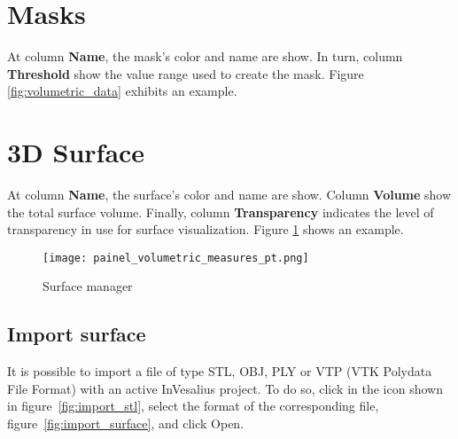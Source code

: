 \newpage


\section{Masks}


At column \textbf{Name}, the mask's color and name are show. In turn, column \textbf{Threshold} show the value range
used to create the mask. Figure \ref{fig:volumetric_data} exhibits an example.

\section{3D Surface}


At column \textbf{Name}, the surface's color and name are show. Column \textbf{Volume} show the total surface volume.
Finally, column \textbf{Transparency} indicates the level of transparency in use for surface visualization.
Figure \ref{fig:surface_manager} shows an example.

\begin{figure}[!htb]
\centering
\texttt{[image: painel\_volumetric\_measures\_pt.png]}
\caption{Surface manager}
\label{fig:surface_manager}
\end{figure}

\subsection{Import surface}


It is possible to import a file of type STL, OBJ, PLY or VTP (VTK Polydata File Format) with an active InVesalius
project. To do so, click in the icon shown in figure~\ref{fig:import_stl}, select the
format of the corresponding file, figure~\ref{fig:import_surface}, and click Open.

